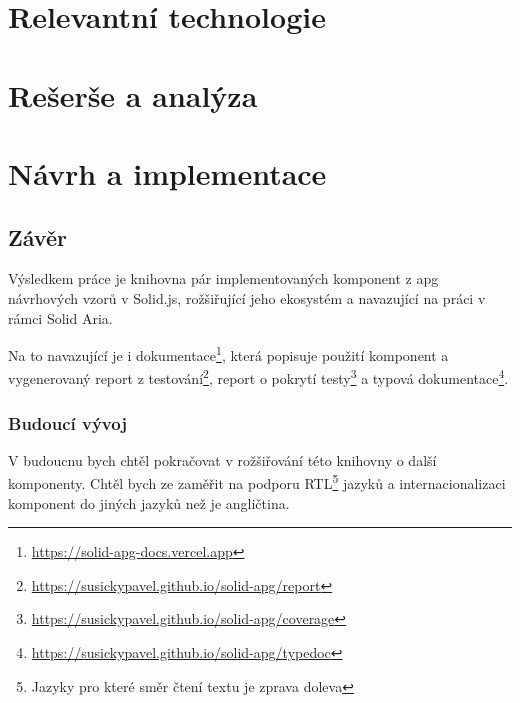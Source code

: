 \documentclass{ctuthesis}
\begin{document}
\maketitle



\part{Relevantní technologie}




\part{Rešerše a analýza}




\part{Návrh a implementace}





\chapter{Závěr}

Výsledkem práce je knihovna pár implementovaných komponent z \gls{apg} návrhových vzorů v Solid.js, rožšiřující jeho ekosystém a navazující na práci v rámci Solid Aria.

Na to navazující je i dokumentace\footnote{\url{https://solid-apg-docs.vercel.app}}, která popisuje použití komponent a vygenerovaný report z testování\footnote{\url{https://susickypavel.github.io/solid-apg/report}}, report o pokrytí testy\footnote{\url{https://susickypavel.github.io/solid-apg/coverage}} a typová dokumentace\footnote{\url{https://susickypavel.github.io/solid-apg/typedoc}}.

\section{Budoucí vývoj}

V budoucnu bych chtěl pokračovat v rožšiřování této knihovny o další komponenty.
Chtěl bych ze zaměřit na podporu RTL\footnote{Jazyky pro které směr čtení textu je zprava doleva} jazyků a internacionalizaci komponent do jiných jazyků než je angličtina.
\end{document}
